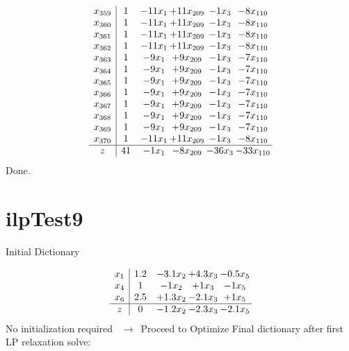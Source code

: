 \documentclass[11pt]{article}
\begin{document}
\[\begin{array}{c| c c@{\hskip 2pt} c@{\hskip 2pt} c@{\hskip 2pt} c@{\hskip 2pt} }
 x_{359}   &  1 & -11 x_{1} & + 11 x_{209} & -1 x_{3} & -8 x_{110}\\
 x_{360}   &  1 & -11 x_{1} & + 11 x_{209} & -1 x_{3} & -8 x_{110}\\
 x_{361}   &  1 & -11 x_{1} & + 11 x_{209} & -1 x_{3} & -8 x_{110}\\
 x_{362}   &  1 & -11 x_{1} & + 11 x_{209} & -1 x_{3} & -8 x_{110}\\
 x_{363}   &  1 & -9 x_{1} & + 9 x_{209} & -1 x_{3} & -7 x_{110}\\
 x_{364}   &  1 & -9 x_{1} & + 9 x_{209} & -1 x_{3} & -7 x_{110}\\
 x_{365}   &  1 & -9 x_{1} & + 9 x_{209} & -1 x_{3} & -7 x_{110}\\
 x_{366}   &  1 & -9 x_{1} & + 9 x_{209} & -1 x_{3} & -7 x_{110}\\
 x_{367}   &  1 & -9 x_{1} & + 9 x_{209} & -1 x_{3} & -7 x_{110}\\
 x_{368}   &  1 & -9 x_{1} & + 9 x_{209} & -1 x_{3} & -7 x_{110}\\
 x_{369}   &  1 & -9 x_{1} & + 9 x_{209} & -1 x_{3} & -7 x_{110}\\
 x_{370}   &  1 & -11 x_{1} & + 11 x_{209} & -1 x_{3} & -8 x_{110}\\
\hline
z    &  41 & -1 x_{1} & -8 x_{209} & -36 x_{3} & -33 x_{110}\\
\end{array}\]
Done.
\section{ilpTest9}

Initial Dictionary 

\[\begin{array}{c| c c@{\hskip 2pt} c@{\hskip 2pt} c@{\hskip 2pt} }
 x_{1}   &  1.2 & -3.1 x_{2} & + 4.3 x_{3} & -0.5 x_{5}\\
 x_{4}   &  1 & -1 x_{2} & + 1 x_{3} & -1 x_{5}\\
 x_{6}   &  2.5 & + 1.3 x_{2} & -2.1 x_{3} & + 1 x_{5}\\
\hline
z    &  0 & -1.2 x_{2} & -2.3 x_{3} & -2.1 x_{5}\\
\end{array}\]
No initialization required \ $\rightarrow$\  Proceed to Optimize 
Final dictionary after first LP relaxation solve: 
\end{document}
